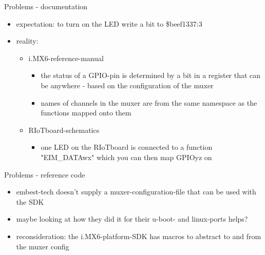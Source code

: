 \documentclass[9pt]{beamer}
\begin{document}
\begin{frame}{Problems - documentation}
\pause
 \begin{itemize}
 \item expectation: to turn on the LED write a bit to \$beef1337:3
\pause
 \item reality:
 	\begin{itemize}
 \item i.MX6-reference-manual
 		\begin{itemize}
 \item the status of a GPIO-pin is determined by a bit in a register that can be anywhere - based on the configuration of the muxer
 \item names of channels in the muxer are from the same namespace as the functions mapped onto them
 		\end{itemize}
 \item RIoTboard-schematics
 		\begin{itemize}
 \item one LED on the RIoTboard is connected to a function "EIM\_DATAwx" \textcolor{light-gray}{which you can then map GPIOyz on}
 		\end{itemize}
 	\end{itemize}
 \end{itemize}
\end{frame}

\begin{frame}{Problems - reference code}
 \begin{itemize}
\pause
 \item embest-tech doesn't supply a muxer-configuration-file that can be used with the SDK
\pause
 \item maybe looking at how they did it for their u-boot- and linux-ports helps?
\pause
 \item reconsideration: the i.MX6-platform-SDK has macros to abstract to and from the muxer config
 \end{itemize}
\end{frame}
\end{document}
